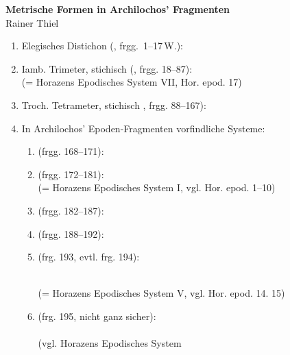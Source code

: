 \documentclass[11pt]{article}
\begin{document}
\begin{center}
{\Large\bf Metrische Formen in Archilochos' Fragmenten}\\
\vspace{2ex}
{\small Rainer Thiel}
\end{center}
\vspace{2ex}
\begin{enumerate}
\item Elegisches Distichon (, frgg.~1--17\,W.):\\
  \metra{\m\mbb\m\mbb\m\c\m\bb\m\bb\m}

\item Iamb. Trimeter, stichisch (, frgg. 18--87):
  \\ 
  (= Horazens Epodisches System VII, Hor. epod. 17)
\item Troch. Tetrameter, stichisch , frgg. 88--167):\par
  \metra{\m\b\m\a\s\m\b\m\a\c\m\b\m\a\s\m\b\m}
\item In Archilochos' Epoden-Fragmenten vorfindliche Systeme:
\begin{enumerate}
\item {} (frgg. 168--171):
  \metra{\bbmb\m\bbmb\m\bbmb\m\bm\c\m\b\m\b\m\bm}
\item {} (frgg. 172--181):
  \metra{\a\m\b\m\s\a\m\b\m\s\a\m\b\m\cc\a\m\b\m\s\a\m\b\m}\\
  (= Horazens Epodisches System I, vgl. Hor. epod. 1--10)
\item {} (frgg. 182--187): %
  \metra{\a\m\b\m\s\a\m\b\m\s\a\m\b\m\cc\m\bb\m\bb\m}
\item {} (frgg. 188--192):\par
\metra{\m\mbb\m\mbb\m\mbb\m\mbb\c\m\b\m\b\m\bm\cc\a\m\b\m\s\a\m\b\m\s\b\m
\m}
\item {} (frg. 193,  evtl. frg. 194):\par
  \metra{\m\mbb\m\mbb\m\mbb\m\mbb\m\mbb\m\a\cc\a\m\b\m\s\a\m\b\m}\\
(= Horazens Epodisches System V, vgl. Hor. epod. 14. 15)
\item \Angus{}\Angud{} (frg. 195, nicht ganz
  sicher):\\\Angus\metra{\m\mbb\m\mbb\m\mbb\m\mbb\m\mbb\m\a}\Angud
  \metra{\m\mbb\m\mbb\m\bb\m\m} \\(vgl. Horazens Epodisches System

\end{enumerate}
\end{enumerate}
\end{document}
